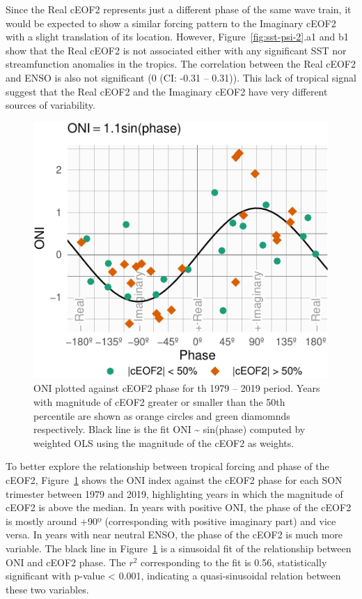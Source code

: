 \documentclass[smallextended]{svjour3}       %
\begin{document}
Since the Real cEOF2 represents just a different phase of the same wave train, it would be expected to show a similar forcing pattern to the Imaginary cEOF2 with a slight translation of its location.
However, Figure~\ref{fig:sst-psi-2}.a1 and b1 show that the Real cEOF2 is not associated either with any significant SST nor streamfunction anomalies in the tropics.
The correlation between the Real cEOF2 and ENSO is also not significant (0 (CI: -0.31 -- 0.31)).
This lack of tropical signal suggest that the Real cEOF2 and the Imaginary cEOF2 have very different sources of variability.





\begin{figure}
\centering
\includegraphics{../figures/enso-phase-1.pdf}
\caption{\label{fig:enso-phase}ONI plotted against cEOF2 phase for th 1979 -- 2019 period.
Years with magnitude of cEOF2 greater or smaller than the 50th percentile are shown as orange circles and green diamomnds respectively.
Black line is the fit ONI \textasciitilde{} sin(phase) computed by weighted OLS using the magnitude of the cEOF2 as weights.}
\end{figure}

To better explore the relationship between tropical forcing and phase of the cEOF2, Figure~\ref{fig:enso-phase} shows the ONI index against the cEOF2 phase for each SON trimester between 1979 and 2019, highlighting years in which the magnitude of cEOF2 is above the median.
In years with positive ONI, the phase of the cEOF2 is mostly around +90º (corresponding with positive imaginary part) and vice versa.
In years with near neutral ENSO, the phase of the cEOF2 is much more variable.
The black line in Figure~\ref{fig:enso-phase} is a sinusoidal fit of the relationship between ONI and cEOF2 phase.
The \(r^2\) corresponding to the fit is 0.56, statistically significant with p-value \textless{} 0.001, indicating a quasi-sinusoidal relation between these two variables.
\end{document}
